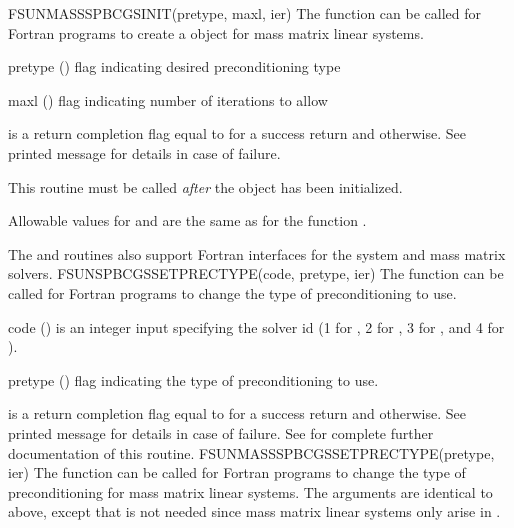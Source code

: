 {
  FSUNMASSSPBCGSINIT(pretype, maxl, ier)
}
{
  The function  can be called for Fortran programs
  to create a {\sunlinsolspbcgs} object for mass matrix linear systems.
}
{
  \begin{args}[pretype]
  \item[pretype] ()
    flag indicating desired preconditioning type
  \item[maxl] ()
    flag indicating number of iterations to allow
  \end{args}
}
{
   is a  return completion flag equal to  for a success
  return and  otherwise. See printed message for details in case
  of failure.
}
{
  This routine must be called \emph{after} the {\nvector} object has
  been initialized.

  Allowable values for  and  are the same as for
  the {\CC} function \newline {}. 
}
%
%
The  and
 routines also support Fortran interfaces
for the system and mass matrix solvers.
%
%
{
  FSUNSPBCGSSETPRECTYPE(code, pretype, ier)
}
{
  The function  can be called for Fortran
  programs to change the type of preconditioning to use.
}
{
  \begin{args}[pretype]
  \item[code] ()
    is an integer input specifying the solver id (1 for {\cvode}, 2
    for {\ida}, 3 for {\kinsol}, and 4 for {\arkode}).
  \item[pretype] ()
    flag indicating the type of preconditioning to use.
  \end{args}
}
{
   is a  return completion flag equal to  for a success
  return and  otherwise. See printed message for details in case
  of failure.
}
{
  See  for complete further documentation of
  this routine.
}
%
%
{
  FSUNMASSSPBCGSSETPRECTYPE(pretype, ier)
}
{
  The function  can be called for Fortran
  programs to change the type of preconditioning for mass matrix
  linear systems.
}
{
  The arguments are identical to  above, except that
   is not needed since mass matrix linear systems only arise
  in {\arkode}.
}
